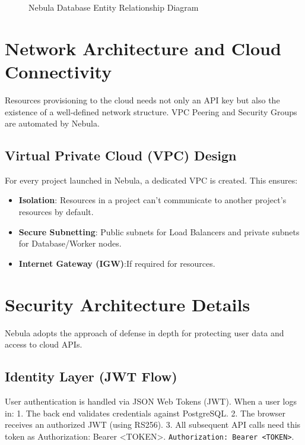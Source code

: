 \begin{figure}[H]
\caption{Nebula Database Entity Relationship Diagram}
\label{fig:erd}
\end{figure}



\section{Network Architecture and Cloud Connectivity}
Resources provisioning to the cloud needs not only an API key but also the existence of a well-defined network structure. VPC Peering and Security Groups are automated by Nebula.

\subsection{Virtual Private Cloud (VPC) Design}
For every project launched in Nebula, a dedicated VPC is created. This ensures:
\begin{itemize}
    \item \textbf{Isolation}: Resources in a project can’t communicate to another project's resources by default.
    \item \textbf{Secure Subnetting}: Public subnets for Load Balancers and private subnets for Database/Worker nodes.
    \item \textbf{Internet Gateway (IGW)}:If required for resources.
\end{itemize}

\section{Security Architecture Details}
Nebula adopts the approach of defense in depth for protecting user data and access to cloud APIs.

\subsection{Identity Layer (JWT Flow)}
User authentication is handled via JSON Web Tokens (JWT). When a user logs in:
1.  The back end validates credentials against PostgreSQL. 2. The browser receives an authorized JWT (using RS256). 3. All subsequent API calls need this token as Authorization: Bearer <TOKEN>.
\texttt{Authorization: Bearer <TOKEN>}.

